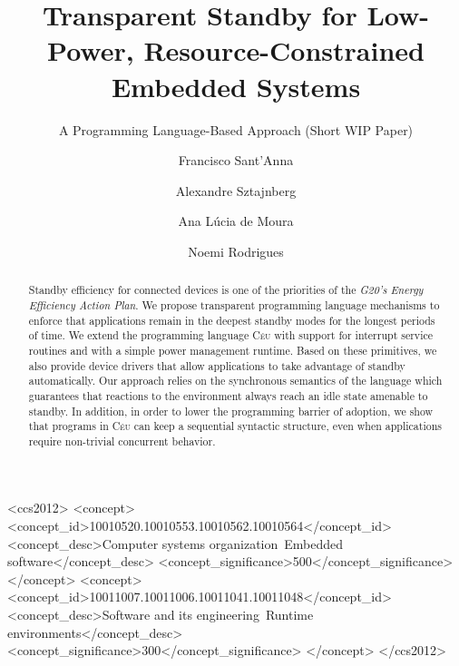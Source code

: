 \documentclass[sigplan,screen]{acmart}
\newcommand{\CEU}{\textsc{C\'{e}u}\xspace}
\begin{document}
\title[Transparent Standby for Low-Power, Resource-Constrained ...]{Transparent Standby for Low-Power, Resource-Constrained Embedded Systems}
\subtitle{A Programming Language-Based Approach (Short WIP Paper)}


\author[F.~Sant'Anna]{Francisco Sant'Anna}
%
\author[A.~Sztajnberg]{Alexandre Sztajnberg}
%
\author[A.L.~de~Moura]{Ana L\'ucia de Moura}
%
\author[N.~Rodrigues]{Noemi Rodrigues}


\begin{abstract}
Standby efficiency for connected devices is one of the priorities of the
\emph{G20's Energy Efficiency Action Plan}.
%
We propose transparent programming language mechanisms to enforce that
applications remain in the deepest standby modes for the longest periods of
time.
%
We extend the programming language \CEU with support for interrupt service
routines and with a simple power management runtime.
%
Based on these primitives, we also provide device drivers that allow
applications to take advantage of standby automatically.
%
Our approach relies on the synchronous semantics of the language which
guarantees that reactions to the environment always reach an idle state
amenable to standby.
%
In addition, in order to lower the programming barrier of adoption, we show
that programs in \CEU can keep a sequential syntactic structure, even when
applications require non-trivial concurrent behavior.
\end{abstract}

%
%
\begin{CCSXML}
<ccs2012>
    <concept>
        <concept_id>10010520.10010553.10010562.10010564</concept_id>
        <concept_desc>Computer systems organization~Embedded software</concept_desc>
    <concept_significance>500</concept_significance>
    </concept>
    <concept>
        <concept_id>10011007.10011006.10011041.10011048</concept_id>
        <concept_desc>Software and its engineering~Runtime environments</concept_desc>
        <concept_significance>300</concept_significance>
    </concept>
</ccs2012>
\end{CCSXML}
\end{document}
